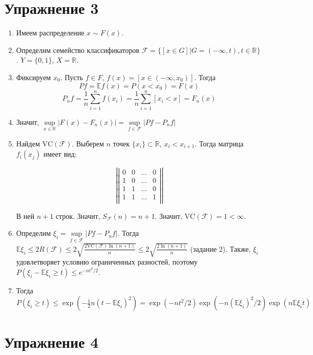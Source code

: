 \documentclass[a4paper]{article}
\newcommand{\matrixl}{\left|\left|}
\newcommand{\matrixr}{\right|\right|}
\newcommand{\VC}{\mbox{VC}}
\newcommand{\F}{\mathcal{F}}
\newcommand{\R}{\mathbb{R}}
\newcommand{\E}{\mathbb{E}}
\begin{document}
\section*{Упражнение 3}
\begin{enumerate}
\item Имеем распределение $x\sim F(x)$.
\item Определим семейство классификаторов $\F=\{[x\in G]\big|G=(-\infty,t),t\in\R\}$. $Y=\{0,1\}$, $X=\R$. %
\item Фиксируем $x_0$. Пусть $f\in F$, $f(x)=[x\in (-\infty, x_0)]$. %
Тогда $$Pf=\E f(x)=P(x< x_0)=F(x)$$ $$P_nf=\frac{1}{n}\sum\limits_{i=1}^nf(x_i)=\frac{1}{n}\sum\limits_{i=1}^n[x_i<x]=F_n(x)$$
\item Значит, $\sup\limits_{x\in \R}|F(x)-F_n(x)|=\sup\limits_{f\in\F}|Pf-P_nf|$
\item Найдем $\VC(\F)$. Выберем $n$ точек $\{x_i\}\subset\R$, $x_i<x_{i+1}$. Тогда матрица $f_i(x_j)$ имеет вид:

$$\matrixl
\begin{array}{cccc}
0 & 0 & ... & 0\\
1 & 0 & ... & 0\\
1 & 1 & ... & 0\\
1 & 1 & ... & 1\\
\end{array}
\matrixr$$

В ней $n+1$ строк. Значит, $S_\F(n)=n+1$. Значит, $\VC(\F)=1<\infty$.
\item Определим $\xi_i=\sup\limits_{f\in\F}|Pf-P_nf|$. Тогда $\E \xi_i\leqslant 2R(\F)\leqslant 2\sqrt{\frac{2\VC(\F)\ln(n+1)}{n}}\leqslant 2\sqrt{\frac{2\ln(n+1)}{n}}$ (задание 2). Также, $\xi_i$ удовлетворяет условию ограниченных разностей, поэтому $P(\xi_i-\E\xi_i\geqslant t)\leqslant e^{-nt^2/2}$.
\item Тогда $P(\xi_i\geqslant t)\leqslant \exp(-\frac{1}{2}n(t-\E\xi_i)^2)=\exp(-nt^2/2)\exp(-n(\E\xi_i)^2/2)\exp(n\E\xi_it)$
\end{enumerate}
\section*{Упражнение 4}
\end{document}
